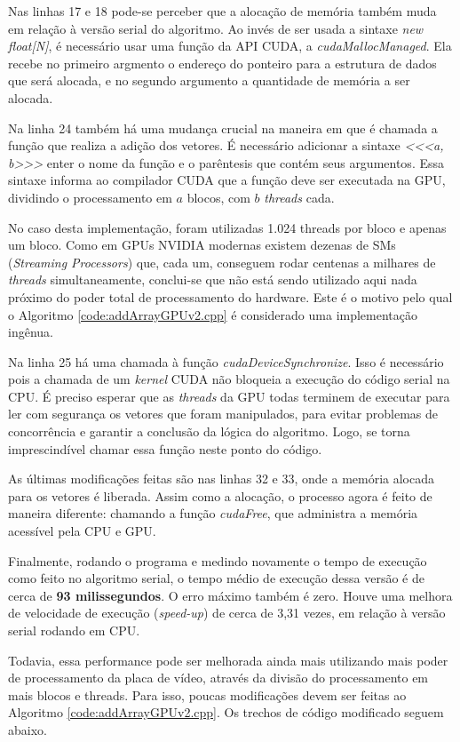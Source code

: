 \documentclass[12pt,
openright, 
oneside, %
a4paper,    %
brazil]{facom-ufu-abntex2}
\begin{document}
Nas linhas 17 e 18 pode-se perceber que a alocação de memória também muda em relação à versão serial do algoritmo. Ao invés de ser usada a sintaxe \textit{new float[N]}, é necessário usar uma função da API CUDA, a \textit{cudaMallocManaged}. Ela recebe no primeiro argmento o endereço do ponteiro para a estrutura de dados que será alocada, e no segundo argumento a quantidade de memória a ser alocada.

Na linha 24 também há uma mudança crucial na maneira em que é chamada a função que realiza a adição dos vetores. É necessário adicionar a sintaxe \textit{<<<a, b>>>} enter o nome da função e o parêntesis que contém seus argumentos. Essa sintaxe informa ao compilador CUDA que a função deve ser executada na GPU, dividindo o processamento em $a$ blocos, com $b$ \textit{threads} cada.

No caso desta implementação, foram utilizadas 1.024 threads por bloco e apenas um bloco. Como em GPUs NVIDIA modernas existem dezenas de SMs (\textit{Streaming Processors}) que, cada um, conseguem rodar centenas a milhares de \textit{threads} simultaneamente, conclui-se que não está sendo utilizado aqui nada próximo do poder total de processamento do hardware. Este é o motivo pelo qual o Algoritmo \ref{code:addArrayGPUv2.cpp} é considerado uma implementação ingênua.

Na linha 25 há uma chamada à função \textit{cudaDeviceSynchronize}. Isso é necessário pois a chamada de um \textit{kernel} CUDA não bloqueia a execução do código serial na CPU. É preciso esperar que as \textit{threads} da GPU todas terminem de executar para ler com segurança os vetores que foram manipulados, para evitar problemas de concorrência e garantir a conclusão da lógica do algoritmo. Logo, se torna imprescindível chamar essa função neste ponto do código.

As últimas modificações feitas são nas linhas 32 e 33, onde a memória alocada para os vetores é liberada. Assim como a alocação, o processo agora é feito de maneira diferente: chamando a função \textit{cudaFree}, que administra a memória acessível pela CPU e GPU.

Finalmente, rodando o programa e medindo novamente o tempo de execução como feito no algoritmo serial, o tempo médio de execução dessa versão é de cerca de \textbf{93 milissegundos}. O erro máximo também é zero. Houve uma melhora de velocidade de execução (\textit{speed-up}) de cerca de 3,31 vezes, em relação à versão serial rodando em CPU.

Todavia, essa performance pode ser melhorada ainda mais utilizando mais poder de processamento da placa de vídeo, através da divisão do processamento em mais blocos e threads. Para isso, poucas modificações devem ser feitas ao Algoritmo \ref{code:addArrayGPUv2.cpp}. Os trechos de código modificado seguem abaixo.
\end{document}
